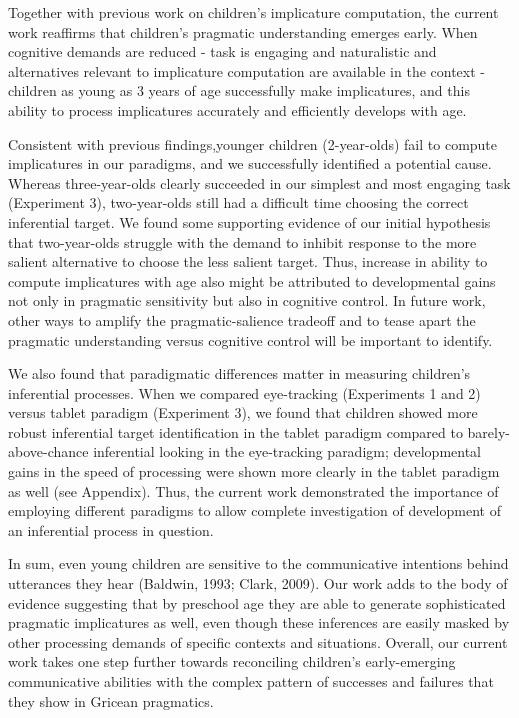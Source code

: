 \documentclass[a4paper,man,apacite,floatsintext]{apa6}
\begin{document}
Together with previous work on children's implicature computation, the
current work reaffirms that children's pragmatic understanding emerges
early. When cognitive demands are reduced - task is engaging and
naturalistic and alternatives relevant to implicature computation are
available in the context - children as young as 3 years of age
successfully make implicatures, and this ability to process implicatures
accurately and efficiently develops with age.

Consistent with previous findings,younger children (2-year-olds) fail to
compute implicatures in our paradigms, and we successfully identified a
potential cause. Whereas three-year-olds clearly succeeded in our
simplest and most engaging task (Experiment 3), two-year-olds still had
a difficult time choosing the correct inferential target. We found some
supporting evidence of our initial hypothesis that two-year-olds
struggle with the demand to inhibit response to the more salient
alternative to choose the less salient target. Thus, increase in ability
to compute implicatures with age also might be attributed to
developmental gains not only in pragmatic sensitivity but also in
cognitive control. In future work, other ways to amplify the
pragmatic-salience tradeoff and to tease apart the pragmatic
understanding versus cognitive control will be important to identify.

We also found that paradigmatic differences matter in measuring
children's inferential processes. When we compared eye-tracking
(Experiments 1 and 2) versus tablet paradigm (Experiment 3), we found
that children showed more robust inferential target identification in
the tablet paradigm compared to barely-above-chance inferential looking
in the eye-tracking paradigm; developmental gains in the speed of
processing were shown more clearly in the tablet paradigm as well (see
Appendix). Thus, the current work demonstrated the importance of
employing different paradigms to allow complete investigation of
development of an inferential process in question.

In sum, even young children are sensitive to the communicative
intentions behind utterances they hear (Baldwin, 1993; Clark, 2009). Our
work adds to the body of evidence suggesting that by preschool age they
are able to generate sophisticated pragmatic implicatures as well, even
though these inferences are easily masked by other processing demands of
specific contexts and situations. Overall, our current work takes one
step further towards reconciling children's early-emerging communicative
abilities with the complex pattern of successes and failures that they
show in Gricean pragmatics.
\end{document}
